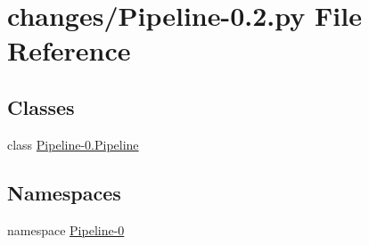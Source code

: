 \hypertarget{changes_2_pipeline-0_82_8py}{\section{changes/\-Pipeline-\/0.2.py \-File \-Reference}
\label{changes_2_pipeline-0_82_8py}
}
\subsection*{\-Classes}
\begin{DoxyCompactItemize}
\item 
class \hyperlink{class_pipeline-0_1_1_pipeline}{\-Pipeline-\/0.\-Pipeline}
\end{DoxyCompactItemize}
\subsection*{\-Namespaces}
\begin{DoxyCompactItemize}
\item 
namespace \hyperlink{namespace_pipeline-0}{\-Pipeline-\/0}
\end{DoxyCompactItemize}
